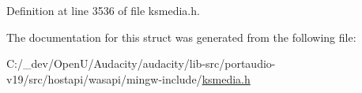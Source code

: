 Definition at line 3536 of file ksmedia.\+h.



The documentation for this struct was generated from the following file\+:\begin{DoxyCompactItemize}
\item 
C\+:/\+\_\+dev/\+Open\+U/\+Audacity/audacity/lib-\/src/portaudio-\/v19/src/hostapi/wasapi/mingw-\/include/\hyperlink{ksmedia_8h}{ksmedia.\+h}\end{DoxyCompactItemize}
